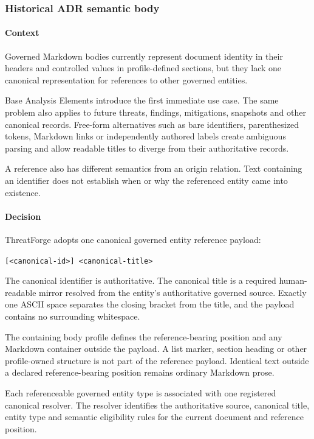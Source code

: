 \documentclass[
  10pt,
]{article}
\begin{document}
\subsubsection{Historical ADR semantic
body}\label{historical-adr-semantic-body-6}

\paragraph{Context}\label{context-12}

Governed Markdown bodies currently represent document identity in their
headers and controlled values in profile-defined sections, but they lack
one canonical representation for references to other governed entities.

Base Analysis Elements introduce the first immediate use case. The same
problem also applies to future threats, findings, mitigations, snapshots
and other canonical records. Free-form alternatives such as bare
identifiers, parenthesized tokens, Markdown links or independently
authored labels create ambiguous parsing and allow readable titles to
diverge from their authoritative records.

A reference also has different semantics from an origin relation. Text
containing an identifier does not establish when or why the referenced
entity came into existence.

\paragraph{Decision}\label{decision-12}

ThreatForge adopts one canonical governed entity reference payload:

\texttt{{[}\textless{}canonical-id\textgreater{}{]}\ \textless{}canonical-title\textgreater{}}

The canonical identifier is authoritative. The canonical title is a
required human-readable mirror resolved from the entity's authoritative
governed source. Exactly one ASCII space separates the closing bracket
from the title, and the payload contains no surrounding whitespace.

The containing body profile defines the reference-bearing position and
any Markdown container outside the payload. A list marker, section
heading or other profile-owned structure is not part of the reference
payload. Identical text outside a declared reference-bearing position
remains ordinary Markdown prose.

Each referenceable governed entity type is associated with one
registered canonical resolver. The resolver identifies the authoritative
source, canonical title, entity type and semantic eligibility rules for
the current document and reference position.
\end{document}
